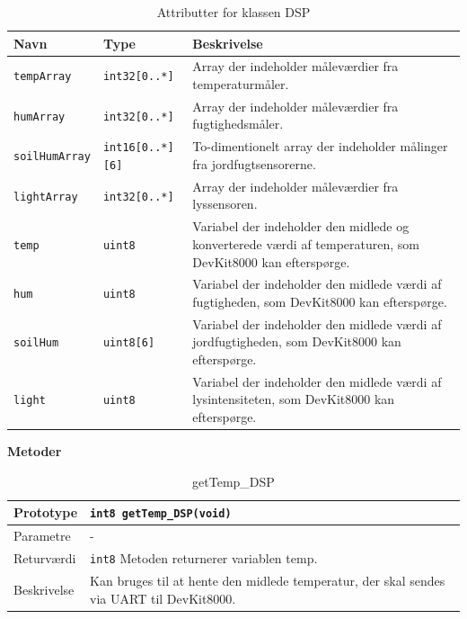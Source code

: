 \begin{table}[h]
\begin{tabularx}{\textwidth}{| Z | Z | L{8 cm} |} \hline
Navn & Type & Beskrivelse \\\hline
\texttt{tempArray} & \texttt{int32[0..*]} & Array der indeholder måleværdier fra temperaturmåler. \\\hline
\texttt{humArray} & \texttt{int32[0..*]} & Array der indeholder måleværdier fra fugtighedsmåler. \\\hline
\texttt{soilHumArray} & \texttt{int16[0..*][6]} & To-dimentionelt array der indeholder målinger fra jordfugtsensorerne. \\\hline
\texttt{lightArray} & \texttt{int32[0..*]} & Array der indeholder måleværdier fra lyssensoren. \\\hline
\texttt{temp} & \texttt{uint8} & Variabel der indeholder den midlede og konverterede værdi af temperaturen, som DevKit8000 kan efterspørge. \\\hline
\texttt{hum} & \texttt{uint8} & Variabel der indeholder den midlede værdi af fugtigheden, som DevKit8000 kan efterspørge. \\\hline
\texttt{soilHum} & \texttt{uint8[6]} & Variabel der indeholder den midlede værdi af jordfugtigheden, som DevKit8000 kan efterspørge. \\\hline
\texttt{light} & \texttt{uint8} & Variabel der indeholder den midlede værdi af lysintensiteten, som DevKit8000 kan efterspørge. \\\hline
\end{tabularx}
\caption{Attributter for klassen DSP}
\label{tbl:DSP_attributter}
\end{table}

\textbf{Metoder}


\begin{table}[h]
\begin{tabularx}{\textwidth}{| L{2.5 cm} | Z |} \hline
Prototype & \texttt{int8 getTemp\_DSP(void)} \\\hline
Parametre & - \\\hline
Returværdi & \texttt{int8} \newline
Metoden returnerer variablen temp. \\\hline
Beskrivelse & Kan bruges til at hente den midlede temperatur, der skal sendes via UART til DevKit8000. \\\hline
\end{tabularx}
\caption{getTemp\_DSP}
\label{table:getTemp_DSP}
\end{table}

